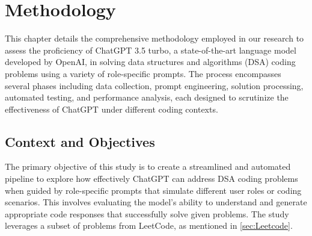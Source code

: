 


\chapter{Methodology}
\label{ch:method}

This chapter details the comprehensive methodology employed in our research to assess the proficiency of ChatGPT 3.5 turbo, a state-of-the-art language model developed by OpenAI, in solving data structures and algorithms (DSA) coding problems using a variety of role-specific prompts. The process encompasses several phases including data collection, prompt engineering, solution processing, automated testing, and performance analysis, each designed to scrutinize the effectiveness of ChatGPT under different coding contexts.

\section{Context and Objectives}
The primary objective of this study is to create a streamlined and automated pipeline to explore how effectively ChatGPT can address DSA coding problems when guided by role-specific prompts that simulate different user roles or coding scenarios. This involves evaluating the model's ability to understand and generate appropriate code responses that successfully solve given problems. The study leverages a subset of problems from LeetCode, as mentioned in \ref{sec:Leetcode}.

